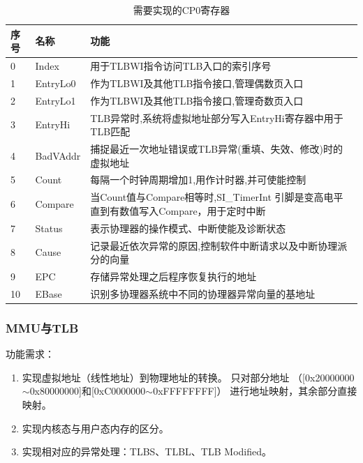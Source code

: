             \begin{table}
            \centering
            \caption{需要实现的CP0寄存器}\label{table_cp0_reg}
            \begin{tabularx}{\textwidth}{|l|l|X|}
            \hline
            序号 & 名称 & 功能 \\
            \hline
            0 & Index & 用于TLBWI指令访问TLB入口的索引序号 \\
            \hline
            1 & EntryLo0 & 作为TLBWI及其他TLB指令接口,管理偶数页入口 \\
            \hline
            2 & EntryLo1 & 作为TLBWI及其他TLB指令接口,管理奇数页入口 \\
            \hline
            3 & EntryHi & TLB异常时,系统将虚拟地址部分写入EntryHi寄存器中用于TLB匹配 \\
            \hline
            4 & BadVAddr & 捕捉最近一次地址错误或TLB异常(重填、失效、修改)时的虚拟地址 \\
            \hline
            5 & Count & 每隔一个时钟周期增加1,用作计时器,并可使能控制 \\
            \hline
            6 & Compare & 当Count值与Compare相等时,SI\_TimerInt 引脚是变高电平直到有数值写入Compare，用于定时中断 \\
            \hline
            7 & Status & 表示协理器的操作模式、中断使能及诊断状态 \\
            \hline
            8 & Cause & 记录最近依次异常的原因,控制软件中断请求以及中断协理派分的向量 \\
            \hline
            9 & EPC & 存储异常处理之后程序恢复执行的地址 \\
            \hline
            10 & EBase & 识别多协理器系统中不同的协理器异常向量的基地址 \\
            \hline
            \end{tabularx}
            \end{table}

        \subsubsection{MMU与TLB}
            功能需求：
            \begin{enumerate}
            \item
                实现虚拟地址（线性地址）到物理地址的转换。%
                只对部分地址%
                （[0x20000000$\sim$0x80000000]和[0xC0000000$\sim$0xFFFFFFFF]）%
                进行地址映射，其余部分直接映射。
            \item
                实现内核态与用户态内存的区分。
            \item
                实现相对应的异常处理：TLBS、TLBL、TLB Modified。
            \end{enumerate}


